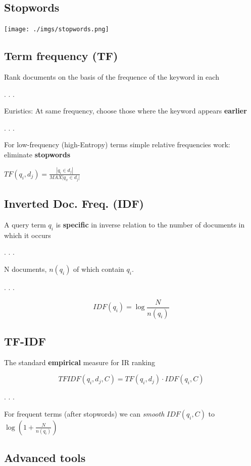 \documentclass[
  letterpaper,
  DIV=11,
  numbers=noendperiod]{scrartcl}
\begin{document}
\subsection{Stopwords}\label{stopwords}

\texttt{[image: ./imgs/stopwords.png]}

\subsection{Term frequency (TF)}\label{term-frequency-tf}

Rank documents on the basis of the frequence of the keyword in each

. . .

Euristics: At same frequency, choose those where the keyword appears
\textbf{earlier}

. . .

For low-frequency (high-Entropy) terms simple relative frequencies work:
eliminate \textbf{stopwords}

\(TF(q_i, d_j) = \frac{|q_i\in d_j|}{MAX{|q_x\in d_j}|}\)

\subsection{Inverted Doc. Freq. (IDF)}\label{inverted-doc.-freq.-idf}

A query term \(q_i\) is \textbf{specific} in inverse relation to the
number of documents in which it occurs

. . .

N documents, \(n(q_i)\) of which contain \(q_i\).

. . .

\[IDF(q_i) = \log \frac{N}{n(q_i)}\]

\subsection{TF-IDF}\label{tf-idf}

The standard \textbf{empirical} measure for IR ranking

\[TFIDF(q_i, d_j, C) = TF(q_i, d_j) \cdot IDF(q_i, C)\]

. . .

For frequent terms (after stopwords) we can \emph{smooth}
\(IDF(q_i, C)\) to \(\log (1+ \frac{N}{n(q_i)})\)

\subsection{Advanced tools}\label{advanced-tools}
\end{document}
